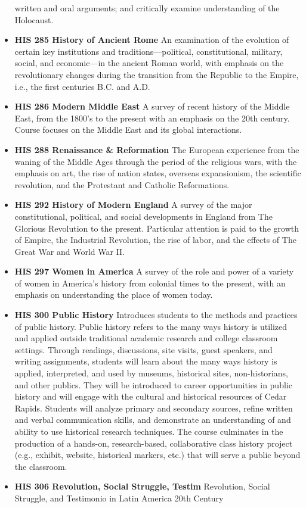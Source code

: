 \documentclass[
  letterpaper,
]{scrbook}
\begin{document}
\begin{itemize}
  written and oral arguments; and critically examine understanding of
  the Holocaust.
\item
  \textbf{HIS 285 History of Ancient Rome} An examination of the
  evolution of certain key institutions and traditions---political,
  constitutional, military, social, and economic---in the ancient Roman
  world, with emphasis on the revolutionary changes during the
  transition from the Republic to the Empire, i.e., the first centuries
  B.C. and A.D.
\item
  \textbf{HIS 286 Modern Middle East} A survey of recent history of the
  Middle East, from the 1800's to the present with an emphasis on the
  20th century. Course focuses on the Middle East and its global
  interactions.
\item
  \textbf{HIS 288 Renaissance \& Reformation} The European experience
  from the waning of the Middle Ages through the period of the religious
  wars, with the emphasis on art, the rise of nation states, overseas
  expansionism, the scientific revolution, and the Protestant and
  Catholic Reformations.
\item
  \textbf{HIS 292 History of Modern England} A survey of the major
  constitutional, political, and social developments in England from The
  Glorious Revolution to the present. Particular attention is paid to
  the growth of Empire, the Industrial Revolution, the rise of labor,
  and the effects of The Great War and World War II.
\item
  \textbf{HIS 297 Women in America} A survey of the role and power of a
  variety of women in America's history from colonial times to the
  present, with an emphasis on understanding the place of women today.
\item
  \textbf{HIS 300 Public History} Introduces students to the methods and
  practices of public history. Public history refers to the many ways
  history is utilized and applied outside traditional academic research
  and college classroom settings. Through readings, discussions, site
  visits, guest speakers, and writing assignments, students will learn
  about the many ways history is applied, interpreted, and used by
  museums, historical sites, non-historians, and other publics. They
  will be introduced to career opportunities in public history and will
  engage with the cultural and historical resources of Cedar Rapids.
  Students will analyze primary and secondary sources, refine written
  and verbal communication skills, and demonstrate an understanding of
  and ability to use historical research techniques. The course
  culminates in the production of a hands-on, research-based,
  collaborative class history project (e.g., exhibit, website,
  historical markers, etc.) that will serve a public beyond the
  classroom.
\item
  \textbf{HIS 306 Revolution, Social Struggle, Testim} Revolution,
  Social Struggle, and Testimonio in Latin America 20th Century
\end{itemize}
\end{document}
